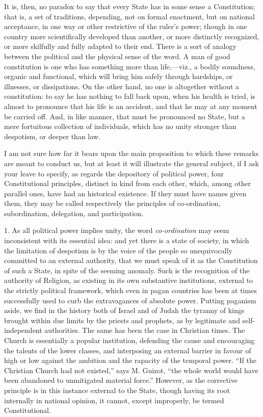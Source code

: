 It is, then, no paradox to say that every State
has in some sense a Constitution; that is, a set of traditions,
depending, not on formal enactment, but on national acceptance, in one
way or other restrictive of the ruler's power; though in one country
more scientifically developed than another, or more distinctly
recognized, or more skilfully and fully adapted to their end. There is
a sort of analogy between the political and the physical sense of the
word. A man of good constitution is one who has something more than
life,—viz., a bodily soundness, organic and functional, which will
bring him safely through hardships, or illnesses, or dissipations. On
the other hand, no one is altogether without a constitution: to say he
has nothing to fall back upon, when his health is tried, is almost to
pronounce that his life is an accident, and that he may at any moment
be carried off. And, in like manner, that must be pronounced no State,
but a mere fortuitous collection of individuals, which has no unity
stronger than despotism, or deeper than law.

I am not sure how far it bears upon the main
proposition to which these remarks are meant to conduct us, but at
least it will illustrate the general subject, if I ask your leave to
specify, as regards the depository of political power, four
Constitutional principles, distinct in kind from each other, which,
among other parallel ones, have had an historical existence. If they
must have names given them, they may be called respectively the
principles of co-ordination, subordination, delegation, and
participation.

1. As all political power implies unity, the word
\emph{co-ordination} may seem inconsistent with its essential idea:
and yet there is a state of society, in which the limitation of
despotism is by the voice of the people so unequivocally committed to
an external authority, that we must speak of it as the Constitution of
such a State, in spite of the seeming anomaly. Such is the recognition
of the authority of Religion, as existing in its own substantive
institutions, external to the strictly political framework, which even
in pagan countries has been at times successfully used to curb the
extravagances of absolute power. Putting paganism aside, we find in
the history both of Israel and of Judah the tyranny of kings brought
within due limits by the priests and prophets, as by legitimate and
self-independent authorities. The same has been the case in Christian
times. The Church is essentially a popular institution, defending the
cause and encouraging the talents of the lower classes, and
interposing an external barrier in favour of high or low against the
ambition and the rapacity of the temporal power. ``If the Christian
Church had not existed,'' says M. Guizot, ``the whole world would have
been abandoned to unmitigated material force.'' However, as the
corrective principle is in this instance external to the State, though
having its root internally in national opinion, it cannot, except
improperly, be termed Constitutional.

